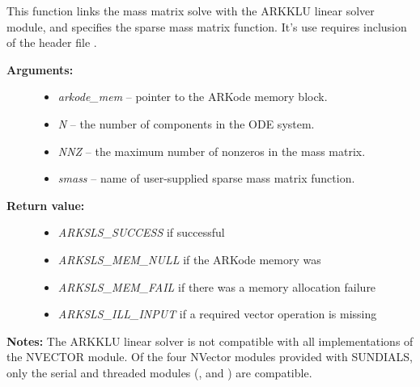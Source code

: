 \documentclass[letterpaper,10pt,english]{sphinxmanual}
\begin{document}
\begin{fulllineitems}
\label{c_interface/User_callable:c.ARKMassKLU}
This function links the mass matrix solve with the ARKKLU linear
solver module, and specifies the sparse mass matrix function.  It's
use requires inclusion of the header file .
\begin{description}
\item[{\textbf{Arguments:}}] \leavevmode\begin{itemize}
\item {} 
\emph{arkode\_mem} -- pointer to the ARKode memory block.

\item {} 
\emph{N} -- the number of components in the ODE system.

\item {} 
\emph{NNZ} -- the maximum number of nonzeros in the mass matrix.

\item {} 
\emph{smass} -- name of user-supplied sparse mass matrix function.

\end{itemize}

\item[{\textbf{Return value:}}] \leavevmode\begin{itemize}
\item {} 
\emph{ARKSLS\_SUCCESS}   if successful

\item {} 
\emph{ARKSLS\_MEM\_NULL}  if the ARKode memory was 

\item {} 
\emph{ARKSLS\_MEM\_FAIL}  if there was a memory allocation failure

\item {} 
\emph{ARKSLS\_ILL\_INPUT} if a required vector operation is missing

\end{itemize}

\end{description}

\textbf{Notes:}  The ARKKLU linear solver is not compatible with all
implementations of the NVECTOR module. Of the four NVector
modules provided with SUNDIALS, only the serial and threaded
modules ({\hyperref[nvectors/NVector_Serial:nvectors-nvserial]{\emph{}}}, {\hyperref[nvectors/NVector_OpenMP:nvectors-openmp]{\emph{}}} and
{\hyperref[nvectors/NVector_Pthreads:nvectors-pthreads]{\emph{}}}) are compatible.

\end{fulllineitems}
\end{document}
